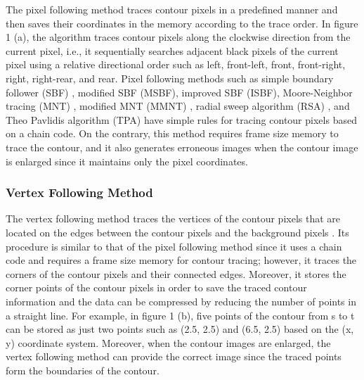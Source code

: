 The pixel following method traces contour pixels in a predefined manner and then saves their coordinates in the memory according to the trace order. In figure 1 (a), the algorithm traces contour pixels along the clockwise direction from the current pixel, i.e., it sequentially searches adjacent black pixels of the current pixel using a relative directional order such as left, front-left, front, front-right, right, right-rear, and rear. Pixel following methods such as simple boundary follower (SBF) \cite{Pitas2000Digital,Das1990Bivariate,Papert1973Uses}, modified SBF (MSBF)\cite{Gose1996Pattern}, improved SBF (ISBF)\cite{Cheong2006Improved}, Moore-Neighbor tracing (MNT) \cite{Toussaint????Grids}, modified MNT (MMNT) \cite{Pradhan2010Contour}, radial sweep algorithm (RSA) \cite{Mirante1982Radial}, and Theo Pavlidis algorithm (TPA)\cite{Pavlidis2012Algorithms} have simple rules for tracing contour pixels based on a chain code. On the contrary, this method requires frame size memory to trace the contour, and it also generates erroneous images when the contour image is enlarged\cite{Miyatake1997Contour} since it maintains only the pixel coordinates.

\subsubsection{Vertex Following Method}
The vertex following method traces the vertices of the contour pixels that are located on the edges between the contour pixels and the background pixels \cite{Miyatake1997Contour}. Its procedure is similar to that of the pixel following method since it uses a chain code and requires a frame size memory for contour tracing; however, it traces the corners of the contour pixels and their connected edges. Moreover, it stores the corner points of the contour pixels in order to save the traced contour information and the data can be compressed by reducing the number of points in a straight line. For example, in figure 1 (b), five points of the contour from s to t can be stored as just two points such as (2.5, 2.5) and (6.5, 2.5) based on the (x, y) coordinate system. Moreover, when the contour images are enlarged, the vertex following method can provide the correct image \cite{Miyatake1997Contour} since the traced points form the boundaries of the contour.

